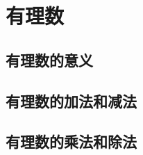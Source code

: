 \chapter{有理数}

\section{有理数的意义}\label{sec:1-1}








\section{有理数的加法和减法}\label{sec:1-2}








\section{有理数的乘法和除法}\label{sec:1-3}


